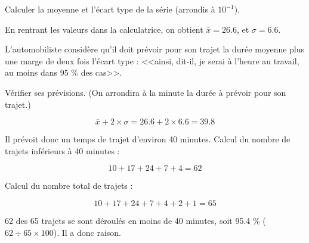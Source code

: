 \begin{questions}
	\question[2] Calculer la moyenne et l'écart type de la série (arrondis à $10^{-1}$).
	\begin{solution}
		En rentrant les valeurs dans la calculatrice, on obtient $\bar{x} = \num{26.6}$, et $\sigma = \num{6.6}$.
	\end{solution}
	
	\question[2] L'automobiliste considère qu'il doit prévoir pour son trajet la durée moyenne plus une marge de deux fois l'écart type : <<ainsi, dit-il, je serai à l'heure au travail, au moins dans 95 \% des cas>>.
	
	Vérifier ses prévisions. (On arrondira à la minute la durée à prévoir pour son trajet.)
	
	\begin{solution}
		\begin{equation*}
			\bar{x} + 2 \times \sigma = \num{26.6} + 2 \times \num{6.6} = \num{39.8}
		\end{equation*}
		
		Il prévoit donc un temps de trajet d'environ 40 minutes. 
		Calcul du nombre de trajets inférieurs à 40 minutes :
		
		\begin{equation*}
			10 + 17 +24 +7 + 4 = 62
		\end{equation*}
		
		Calcul du nombre total de trajets :
		
		\begin{equation*}
			10 + 17 +24 +7 + 4  + 2 + 1 = 65
		\end{equation*}
		
		62 des 65 trajets se sont déroulés en moins de 40 minutes, soit \num{95.4} \% ($62 \div 65 \times 100$). Il a donc raison. 
	\end{solution}
\end{questions}